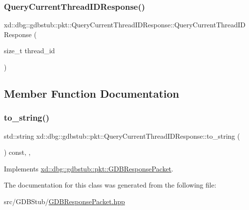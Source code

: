 \subsubsection{\texorpdfstring{Query\+Current\+Thread\+I\+D\+Response()}{QueryCurrentThreadIDResponse()}}
{\footnotesize\ttfamily xd\+::dbg\+::gdbstub\+::pkt\+::\+Query\+Current\+Thread\+I\+D\+Response\+::\+Query\+Current\+Thread\+I\+D\+Response (\begin{DoxyParamCaption}\item[{size\+\_\+t}]{thread\+\_\+id }\end{DoxyParamCaption})\hspace{0.3cm}{\ttfamily [inline]}}



\subsection{Member Function Documentation}
\mbox{\label{classxd_1_1dbg_1_1gdbstub_1_1pkt_1_1_query_current_thread_i_d_response_a59e75efa133c4c1c8f5e606ea638f012}} 
\subsubsection{\texorpdfstring{to\+\_\+string()}{to\_string()}}
{\footnotesize\ttfamily std\+::string xd\+::dbg\+::gdbstub\+::pkt\+::\+Query\+Current\+Thread\+I\+D\+Response\+::to\+\_\+string (\begin{DoxyParamCaption}{ }\end{DoxyParamCaption}) const\hspace{0.3cm}{\ttfamily [inline]}, {\ttfamily [override]}, {\ttfamily [virtual]}}



Implements \mbox{\hyperlink{classxd_1_1dbg_1_1gdbstub_1_1pkt_1_1_g_d_b_response_packet_a2a15795536cd5ff94f0533c406233874}{xd\+::dbg\+::gdbstub\+::pkt\+::\+G\+D\+B\+Response\+Packet}}.



The documentation for this class was generated from the following file\+:\begin{DoxyCompactItemize}
\item 
src/\+G\+D\+B\+Stub/\mbox{\hyperlink{_g_d_b_response_packet_8hpp}{G\+D\+B\+Response\+Packet.\+hpp}}\end{DoxyCompactItemize}
